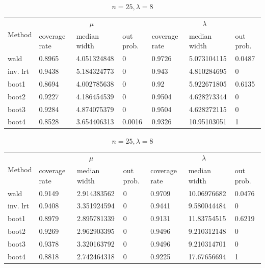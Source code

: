 \documentclass{article}
\begin{document}
       \begin{table}
       \ContinuedFloat
        \begin{subtable}[b]{\textwidth}
		\centering
		\begin{tabular}{l|lll|lll}
		\toprule
        \multirow{2}{*}{Method} & \multicolumn{3}{c|}{$\mu$}      & \multicolumn{3}{c}{$\lambda$}  \\ 
                           & coverage rate & median width & out prob. & coverage rate & median width & out prob. \\
                           \midrule
wald      &0.8965	&4.051324848	&0      &0.9726	&5.073104115 &0.0487\\
inv. lrt  &0.9438	&5.184324773	&0      &0.943	&4.810284695 &0     \\
boot1     &0.8694	&4.002785638	&0      &0.92	&5.922671805 &0.6135\\
boot2     &0.9227	&4.186454539	&0      &0.9504	&4.628273344 &0     \\
boot3     &0.9284	&4.874075379	&0      &0.9504	&4.628272115 &0     \\
boot4     &0.8528	&3.654406313	&0.0016 &0.9326	&10.95103051 &1     \\
       \bottomrule
       \end{tabular}
       \caption{$n = 25, \lambda = 4$}
       \label{25_4}
       \end{subtable}%

        \begin{subtable}[b]{\textwidth}
		\centering
		\begin{tabular}{l|lll|lll}
		\toprule
        \multirow{2}{*}{Method} & \multicolumn{3}{c|}{$\mu$}      & \multicolumn{3}{c}{$\lambda$}  \\ 
                           & coverage rate & median width & out prob. & coverage rate & median width & out prob. \\
                           \midrule
wald      &0.9149	&2.914383562	&0  &0.9709	&10.06976682	&0.0476\\
inv. lrt  &0.9408	&3.351924594	&0  &0.9441	&9.580044484	&0     \\
boot1     &0.8979	&2.895781339	&0  &0.9131	&11.83754515	&0.6219\\
boot2     &0.9269	&2.962903395	&0  &0.9496	&9.210312148	&0     \\
boot3     &0.9378	&3.320163792	&0  &0.9496	&9.210314701	&0     \\
boot4     &0.8818	&2.742464318	&0  &0.9225	&17.67656694	&1     \\
       \bottomrule
       \end{tabular}
       \caption{$n = 25, \lambda = 8$}
       \label{25_8}
       \end{subtable}%


\end{table}
\end{document}
